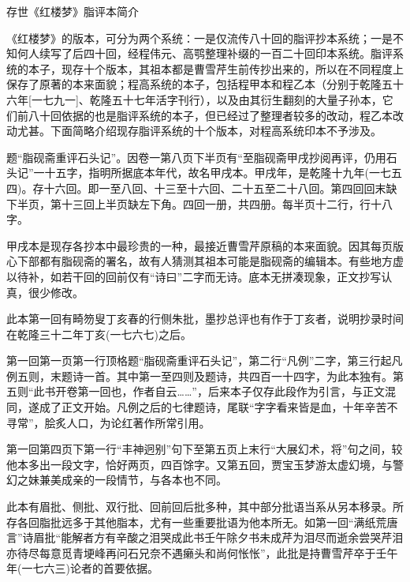 \newpage

\begin{center}
	{\Huge \heiti 存世《红楼梦》脂评本简介}
\end{center}



《红楼梦》的版本，可分为两个系统：一是仅流传八十回的脂评抄本系统；一是不知何人续写了后四十回，经程伟元、高鹗整理补缀的一百二十回印本系统。脂评系统的本子，现存十个版本，其祖本都是曹雪芹生前传抄出来的，所以在不同程度上保存了原著的本来面貌；程高系统的本子，包括程甲本和程乙本（分别于乾隆五十六年{[}一七九一{]}、乾隆五十七年活字刊行），以及由其衍生翻刻的大量子孙本，它们前八十回依据的也是脂评系统的本子，但已经过了整理者较多的改动，程乙本改动尤甚。下面简略介绍现存脂评系统的十个版本，对程高系统印本不予涉及。

{ }

题``脂砚斋重评石头记''。因卷一第八页下半页有``至脂砚斋甲戌抄阅再评，仍用石头记''一十五字，指明所据底本年代，故名甲戌本。甲戌年，是乾隆十九年(一七五四)。存十六回。即一至八回、十三至十六回、二十五至二十八回。第四回回末缺下半页，第十三回上半页缺左下角。四回一册，共四册。每半页十二行，行十八字。

甲戌本是现存各抄本中最珍贵的一种，最接近曹雪芹原稿的本来面貌。因其每页版心下部都有脂砚斋的署名，故有人猜测其祖本可能是脂砚斋的编辑本。有些地方虚以待补，如若干回的回前仅有``诗曰''二字而无诗。底本无拼凑现象，正文抄写认真，很少修改。

此本第一回有畸笏叟丁亥春的行侧朱批，墨抄总评也有作于丁亥者，说明抄录时间在乾隆三十二年丁亥(一七六七)之后。

第一回第一页第一行顶格题``脂砚斋重评石头记''，第二行``凡例''二字，第三行起凡例五则，末题诗一首。其中第一至四则及题诗，共四百一十四字，为此本独有。第五则``此书开卷第一回也，作者自云\ldots{}\ldots{}''，后来本子仅存此段作为引言，与正文混同，遂成了正文开始。凡例之后的七律题诗，尾联``字字看来皆是血，十年辛苦不寻常''，脍炙人口，为论红著作所常引用。

第一回第四页下第一行``丰神迥别''句下至第五页上末行``大展幻术，将''句之间，较他本多出一段文字，恰好两页，四百馀字。又第五回，贾宝玉梦游太虚幻境，与警幻之妹兼美成亲的一段情节，与各本也不同。

此本有眉批、侧批、双行批、回前回后批多种，其中部分批语当系从另本移录。所存各回脂批远多于其他脂本，尤有一些重要批语为他本所无。如第一回``满纸荒唐言''诗眉批``能解者方有辛酸之泪哭成此书壬午除夕书未成芹为泪尽而逝余尝哭芹泪亦待尽每意觅青埂峰再问石兄奈不遇癞头和尚何怅怅''，此批是持曹雪芹卒于壬午年(一七六三)论者的首要依据。

